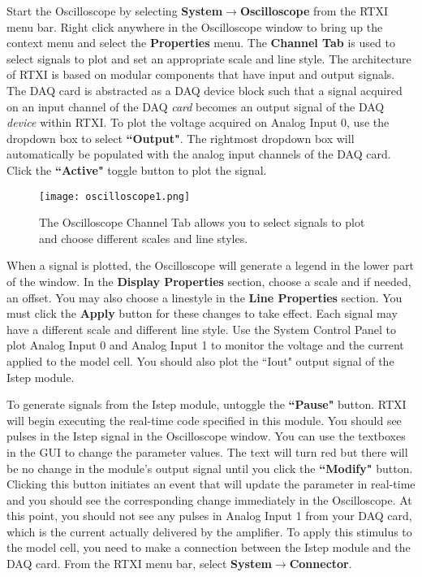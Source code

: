 \vspace{1cm}
Start the Oscilloscope by selecting \textbf{System}$\rightarrow$\textbf{Oscilloscope} from the RTXI menu bar. Right click anywhere in the Oscilloscope window to bring up the context menu and select the \textbf{Properties} menu. The \textbf{Channel Tab} is used to select signals to plot and set an appropriate scale and line style. The architecture of RTXI is based on modular components that have input and output signals. \attention The DAQ card is abstracted as a DAQ device block such that a signal acquired on an input channel of the DAQ \emph{card} becomes an output signal of the DAQ \emph{device} within RTXI. To plot the voltage acquired on Analog Input 0, use the dropdown box to select \textbf{``Output"}. The rightmost dropdown box will automatically be populated with the analog input channels of the DAQ card. Click the \textbf{``Active"} toggle button to plot the signal. 

\begin{figure}[h]
\begin{center}
\texttt{[image: oscilloscope1.png]} 
\caption[Oscilloscope]{The Oscilloscope Channel Tab allows you to select signals to plot and choose different scales and line styles.} 
\end{center}
\end{figure}

When a signal is plotted, the Oscilloscope will generate a legend in the lower part of the window. In the \textbf{Display Properties} section, choose a scale and if needed, an offset. You may also choose a linestyle in the \textbf{Line Properties} section. You must click the \textbf{Apply} button for these changes to take effect. Each signal may have a different scale and different line style. Use the System Control Panel to plot Analog Input 0 and Analog Input 1 to monitor the voltage and the current applied to the model cell. You should also plot the ``Iout" output signal of the Istep module.

\vspace{1cm}
To generate signals from the Istep module, untoggle the \textbf{``Pause"} button. RTXI will begin executing the real-time code specified in this module. You should see pulses in the Istep signal in the Oscilloscope window. You can use the textboxes in the GUI to change the parameter values. The text will turn red but there will be no change in the module's output signal until you click the \textbf{``Modify"} button. Clicking this button initiates an event that will update the parameter in real-time and you should see the corresponding change immediately in the Oscilloscope. At this point, you  should not see any pulses in Analog Input 1 from your DAQ card, which is the current actually delivered by the amplifier. To apply this stimulus to the model cell, you need to make a connection between the Istep module and the DAQ card. From the RTXI menu bar, select \textbf{System}$\rightarrow$\textbf{Connector}. 

